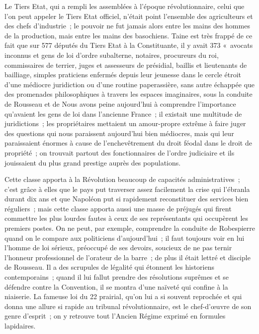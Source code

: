 \documentclass[french,twoside]{book} %
\begin{document}
\noindent Le Tiers Etat, qui a rempli les assemblées à l’époque révolutionnaire, celui que l’on peut appeler le Tiers Etat officiel, n’était point l’ensemble des agriculteurs et des chefs d’industrie ; le pouvoir ne fut jamais alors entre les mains des hommes de la production, mais entre les mains des basochiens. Taine est très frappé de ce fait que sur 577 députés du Tiers Etat à la Constituante, il y avait 373 « avocats inconnus et gens de loi d’ordre subalterne, notaires, procureurs du roi, commissaires de terrier, juges et assesseurs de présidial, baillis et lieutenants de bailliage, simples praticiens enfermés depuis leur jeunesse dans le cercle étroit d’une médiocre juridiction ou d’une routine paperassière, sans autre échappée que des promenades philosophiques à travers les espaces imaginaires, sous la conduite de Rousseau et de   Nous avons peine aujourd’hui à comprendre l’importance qu’avaient les gens de loi dans l’ancienne France ; il existait une multitude de juridictions ; les propriétaires mettaient un amour-propre extrême à faire juger des questions qui nous paraissent aujourd’hui bien médiocres, mais qui leur paraissaient énormes à cause de l’enchevêtrement du droit féodal dans le droit de propriété ; on trouvait partout des fonctionnaires de l’ordre judiciaire et ils jouissaient du plus grand prestige auprès des populations.\par
Cette classe apporta à la Révolution beaucoup de capacités administratives ; c’est grâce à elles que le pays put traverser assez facilement la crise qui l’ébranla durant dix ans et que Napoléon put si rapidement reconstituer des services bien réguliers ; mais cette classe apporta aussi une masse de préjugés qui firent commettre les plus lourdes fautes à ceux de ses représentants qui occupèrent les premiers postes. On ne peut, par exemple, comprendre la conduite de Robespierre quand on le compare aux politiciens d’aujourd’hui ; il faut toujours voir en lui l’homme de loi sérieux, préoccupé de ses devoirs, soucieux de ne pas ternir l’honneur professionnel de l’orateur de la barre ; de plus il était lettré et disciple de Rousseau. Il a des scrupules de légalité qui étonnent les historiens contemporains ; quand il lui fallut prendre des résolutions suprêmes et se défendre contre la Convention, il se montra d’une naïveté qui confine à la niaiserie. La  fameuse loi du 22 prairial, qu’on lui a si souvent reprochée et qui donna une allure si rapide au tribunal révolutionnaire, est le chef-d’œuvre de son genre d’esprit ; on y retrouve tout l’Ancien Régime exprimé en formules lapidaires.\par
\end{document}
